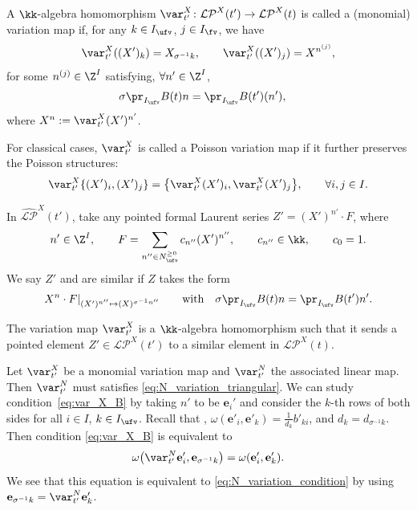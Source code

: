 \documentclass[pdftex]{sigma}
\newcommand{\Iufv}{I_{\ufv}}
\newcommand{\Ifv}{I_{\fv}}
\newcommand{\LP}{{\mathcal{LP}}}
\newcommand{\hLP}{\widehat{\mathcal{LP}}}
\newcommand{\ee}{\mathbf{e}}
\numberwithin{equation}{section}
\begin{document}
\begin{Definition}\label{def:X_variation_map}
 A $\kk$-algebra homomorphism $\var_{t'}^X\colon\LP^{X}(t')\rightarrow \LP^{X}(t)$ is called a (monomial) variation map if, for any $k\in \Iufv$, $j\in \Ifv$, we have
 \begin{equation*}%
 \var_{t'}^{X}((X')_k) = X_{\sigma^{-1}k},\qquad
 \var_{t'}^{X}((X')_{j}) = X^{n^{(j)}},
 \end{equation*}
 for some $n^{(j)}\in \Z^I$ satisfying, $\forall n'\in \Z^{I}$,
 \begin{align}\label{eq:var_X_B}
 \sigma \pr_{\Iufv} B(t) n&=\pr_{\Iufv}B(t')(n'),
 \end{align}
 where $X^n:=\var_{t'}^X (X')^{n'}$.

 For classical cases, $\var_{t'}^{X}$ is called a Poisson variation map if it further preserves
 the Poisson structures:
 \begin{align*}
 \var_{t'}^{X}\{(X')_{i},(X')_{j}\} =\bigl\{\var_{t'}^{X}(X')_{i},\var_{t'}^{X}(X')_{j}\bigr\},\qquad\forall i,j\in I.
 \end{align*}
\end{Definition}

\begin{Definition}
 In $\hLP^X(t')$, take any pointed formal Laurent series $Z'=(X')^{n'} \cdot F$, where
 \[n'\in \Z^I, \qquad F=\sum_{n''\in N_{\ufv}^{\geq 0}} c_{n''} (X')^{n''}, \qquad c_{n''}\in \kk, \qquad c_0=1.\] We say $Z'$ and \smash{$Z\in \hLP^X(t)$} are similar if $Z$ takes the form \[X^{n}\cdot F|_{(X')^{n''}\mapsto (X)^{\sigma^{-1} n''}}\qquad \text{with}\quad \sigma \pr_{\Iufv}B(t)n=\pr_{\Iufv}B(t')n'.\]
\end{Definition}

\begin{Remark}\label{rem:X-variation_map_pointed_elements}
 The variation map $\var_{t'}^X$ is a $\kk$-algebra homomorphism such that it sends a pointed element $Z'\in \LP^X(t')$ to a similar element in $\LP^X(t)$.
\end{Remark}

\begin{Remark}\label{rem:variation_X_N_translation}
 Let $\var^X_{t'}$ be a monomial variation map and $\var^N_{t'}$ the associated linear map. Then $\var^N_{t'}$ must satisfies \eqref{eq:N_variation_triangular}. We can study condition~\eqref{eq:var_X_B} by taking $n'$ to be $\ee_i'$ and consider the $k$-th rows of both sides for all $i\in I$, $k\in \Iufv$. Recall that \smash{$\omega(n,\ee_{\sigma^{-1}k})=\frac{1}{d_{\sigma^{-1}k}}(B n)_{\sigma^{-1}k}$}, $\omega(\ee'_i,\ee'_k)=\frac{1}{d_k}b'_{ki}$, and $d_k=d_{\sigma^{-1} k}$. Then condition \eqref{eq:var_X_B} is equivalent to
\begin{align*}
 \omega\big(\var^N_{t'}\ee_i',\ee_{\sigma^{-1} k}\big)=\omega(\ee_i',\ee_k').
\end{align*}
We see that this equation is equivalent to \eqref{eq:N_variation_condition} by using $\ee_{\sigma^{-1} k}=\var^N_{t'}\ee_k'$.
\end{Remark}
\end{document}
